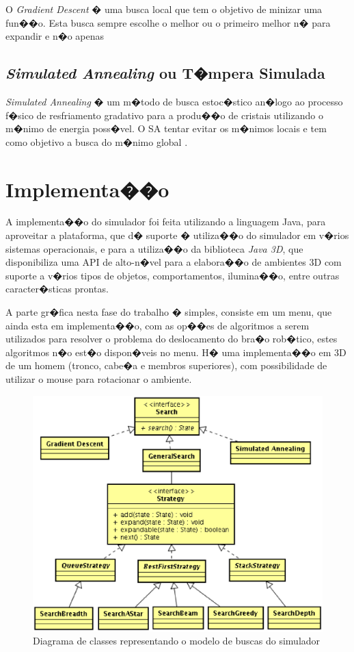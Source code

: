 \documentclass[12pt]{article}
\begin{document}
O \textit{Gradient Descent} � uma busca local que tem o objetivo de minizar uma fun��o. Esta busca sempre escolhe o melhor ou o primeiro melhor n� para expandir e n�o apenas

\subsection{\textit{Simulated Annealing} ou T�mpera Simulada}

\textit{Simulated Annealing} � um m�todo de busca estoc�stico an�logo ao processo f�sico de resfriamento gradativo para a produ��o de cristais utilizando o m�nimo de energia poss�vel. O SA tentar evitar os m�nimos locais e tem como objetivo a busca do m�nimo global \cite{carson97simulation}. 

\section{Implementa��o}

A implementa��o do simulador foi feita utilizando a linguagem Java, para aproveitar a plataforma, que d� suporte � utiliza��o do simulador em v�rios sistemas operacionais, e para a utiliza��o da biblioteca \textit{Java 3D}, que disponibiliza uma API de alto-n�vel para a elabora��o de ambientes 3D com suporte a v�rios tipos de objetos, comportamentos, ilumina��o, entre outras caracter�sticas prontas.

A parte gr�fica nesta fase do trabalho � simples, consiste em um menu, que ainda esta em implementa��o, com as op��es de algoritmos a serem utilizados para resolver o problema do deslocamento do bra�o rob�tico, estes algoritmos n�o est�o dispon�veis no menu. H� uma implementa��o em 3D de um homem (tronco, cabe�a e membros superiores), com possibilidade de utilizar o mouse para rotacionar o ambiente.

\begin{figure}
	\centering
	\label{fig:1}
	\includegraphics[scale=0.7]{class_diagram.eps}
	\caption{Diagrama de classes representando o modelo de buscas do simulador}
\end{figure}
\end{document}

